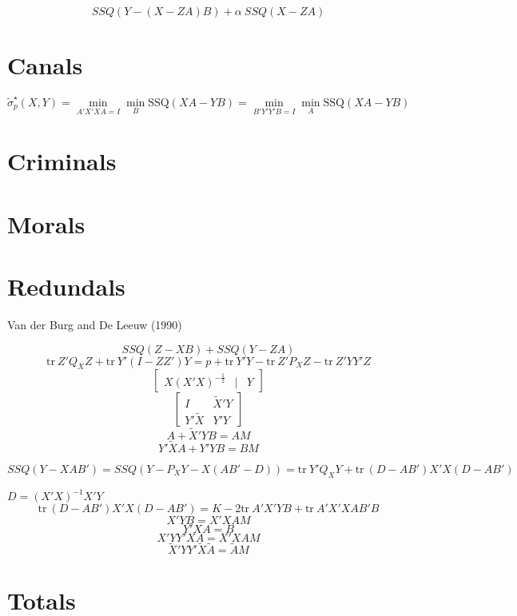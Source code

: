 \documentclass[
  12pt,
]{article}
\begin{document}
\[
SSQ(Y-(X-ZA)B)+\alpha\ SSQ(X-ZA)
\]

\hypertarget{canals}{%
\section{Canals}\label{canals}}

\begin{equation}
\tilde\sigma_p^\star(X,Y)=\min_{A'X'XA=I}\min_B \text{SSQ}(XA-YB)=\min_{B'Y'Y'B=I}\min_A \text{SSQ}(XA-YB)
\label{eq:canals}
\end{equation}

\hypertarget{criminals}{%
\section{Criminals}\label{criminals}}

\hypertarget{morals}{%
\section{Morals}\label{morals}}

\hypertarget{redundals}{%
\section{Redundals}\label{redundals}}

Van der Burg and De Leeuw (1990)

\[
SSQ(Z-XB)+SSQ(Y-ZA)
\]
\[
\text{tr}\ Z'Q_XZ+\text{tr}\ Y'(I-ZZ')Y=p+\text{tr}\ Y'Y-\text{tr}\ Z'P_XZ-\text{tr}\ Z'YY'Z
\]
\[
\begin{bmatrix}
X(X'X)^{-\frac12}&\mid&Y
\end{bmatrix}
\]
\[
\begin{bmatrix}
I&\tilde X'Y\\
Y'\tilde X&Y'Y
\end{bmatrix}
\]
\[
A+\tilde X'YB=AM
\]
\[
Y'\tilde XA+Y'YB=BM
\]

\[
SSQ(Y-XAB')=SSQ(Y-P_XY-X(AB'-D))=\text{tr}\ Y'Q_XY+\text{tr}\ (D-AB')X'X(D-AB')
\]

\(D = (X'X)^{-1}X'Y\)
\[
\text{tr}\ (D-AB')X'X(D-AB')=K-2\text{tr}\ A'X'YB+\text{tr}\ A'X'XAB'B
\]
\[X'YB=X'XAM\]
\[Y'XA=B\]
\[
X'YY'XA=X'XAM
\]
\[
\tilde X'YY'\tilde X\tilde A=\tilde AM
\]

\hypertarget{totals}{%
\section{Totals}\label{totals}}
\end{document}
